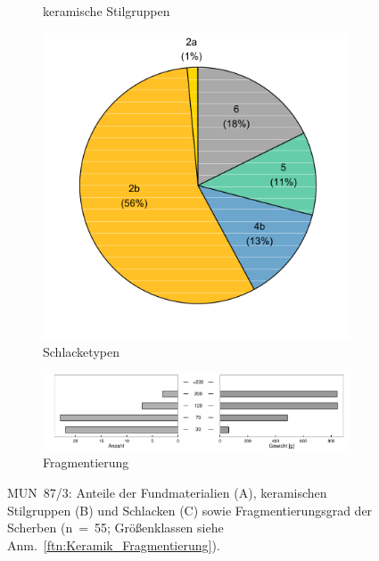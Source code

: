 \begin{figure}[p]
\begin{subfigure}[t]{0.3\textwidth}
		\caption{keramische Stilgruppen}
		\label{fig:MUN87-3_Stilgruppen}
	\end{subfigure}\hfill
	\begin{subfigure}[t]{0.3\textwidth}
		\centering
		\includegraphics[width = \textwidth]{fig/9-18_MUN87-3_Schlacketypen_R_modDS.pdf}
		\caption{Schlacketypen\vspace{1em}}
		\label{fig:MUN87-3_SchlackeTyp}
	\end{subfigure}
	\begin{subfigure}[t]{\textwidth}
		\centering
		\includegraphics[width = \textwidth]{fig/9-15_MUN87-3_Fragmentierung_2.pdf}
		\caption{Fragmentierung}
		\label{fig:MUN87-3_Fragmentierung}
	\end{subfigure}
	\caption{MUN~87/3: Anteile der Fundmaterialien (A), keramischen Stilgruppen (B) und Schlacken (C) sowie Fragmentierungsgrad der Scherben (n~=~55; Größenklassen siehe Anm.~\ref{ftn:Keramik_Fragmentierung}).}
	\label{fig:MUN87-3_Funde}
\end{figure}

